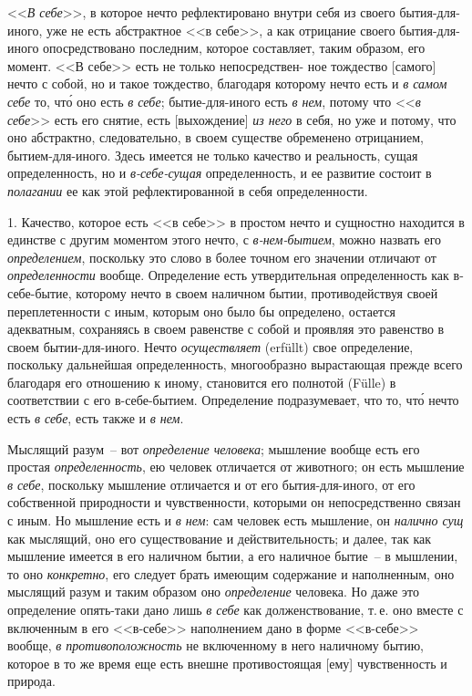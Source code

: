<<\emph{В себе}>>, в которое нечто рефлектировано внутри себя
из своего бытия-для-иного, уже не есть абстрактное
<<в себе>>, а как отрицание своего бытия-для-иного опосредствовано
последним, которое составляет, таким образом,
его момент. <<В себе>> есть не только непосредствен-
ное тождество [самого] нечто с собой, но и такое тождество,
благодаря которому нечто есть и \emph{в самом себе} то,
чт\'о оно есть \emph{в себе}; бытие-для-иного есть \emph{в нем}, потому
что <<\emph{в себе}>> есть его снятие, есть [выхождение] \emph{из него}
в себя, но уже и потому, что оно абстрактно, следовательно,
в своем существе обременено отрицанием, бытием-для-иного.
Здесь имеется не только качество и реальность,
сущая определенность, но и \emph{в-себе-сущая} определенность,
и ее развитие состоит в \emph{полагании} ее как этой
рефлектированной в себя определенности.

1. Качество, которое есть <<в себе>> в простом нечто
и сущностно находится в единстве с другим моментом
этого нечто, с \emph{в-нем-бытием}, можно назвать его \emph{определением},
поскольку это слово в более точном его значении
отличают от \emph{определенности} вообще. Определение есть
утвердительная определенность как в-себе-бытие, которому
нечто в своем наличном бытии, противодействуя своей
переплетенности с иным, которым оно было бы определено,
остается адекватным, сохраняясь в своем равенстве
с собой и проявляя это равенство в своем бытии-для-иного.
Нечто \emph{осуществляет} (erfüllt) свое определение\endnotemark{}, поскольку
дальнейшая определенность, многообразно вырастающая
прежде всего благодаря его отношению к иному,
становится его полнотой (Fülle) в соответствии с его
в-себе-бытием. Определение подразумевает, что то, чт\'о
нечто есть \emph{в себе}, есть также и \emph{в нем}.


Мыслящий разум~-- вот \emph{определение человека}; мышление
вообще есть его простая \emph{определенность}, ею человек
отличается от животного; он есть мышление \emph{в себе},
поскольку мышление отличается и от его бытия-для-иного,
от его собственной природности и чувственности,
которыми он непосредственно связан с иным. Но мышление
есть и \emph{в нем}: сам человек есть мышление, он \emph{налично
сущ} как мыслящий, оно его существование и действительность;
и далее, так как мышление имеется в его наличном
бытии, а его наличное бытие~-- в мышлении, то
оно \emph{конкретно}, его следует брать имеющим содержание
и наполненным, оно мыслящий разум и таким образом
оно \emph{определение} человека. Но даже это определение
опять-таки дано лишь \emph{в себе} как долженствование, т.\,е.
оно вместе с включенным в его <<в-себе>> наполнением
дано в форме <<в-себе>> вообще, \emph{в противоположность} не
включенному в него наличному бытию, которое в то же
время еще есть внешне противостоящая [ему] чувственность
и природа.


